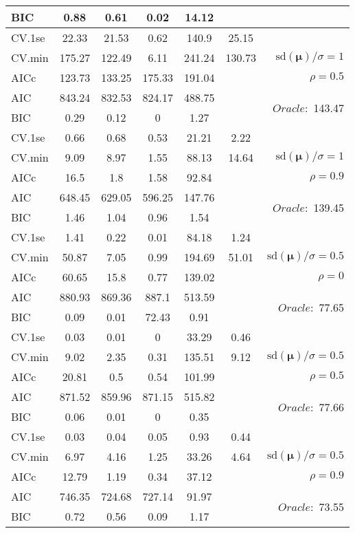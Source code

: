 \begin{table}
\begin{center}
\begin{tabular}{l*{5}{c}|r}
BIC & 0.88 & 0.61 & 0.02 & 14.12 & &  \\
 \hline 
CV.1se & 22.33 & 21.53 & 0.62 & 140.9 & 25.15 & \\
CV.min & 175.27 & 122.49 & 6.11 & 241.24 & 130.73 &  $\mathrm{sd}(\mathbf{\mu})/\sigma=1$ \\
AICc & 123.73 & 133.25 & 175.33 & 191.04 & & $\rho=0.5$ \\
AIC & 843.24 & 832.53 & 824.17 & 488.75 & &  \multirow{2}{*}{$Oracle: $ 143.47} \\
BIC & 0.29 & 0.12 & 0 & 1.27 & &  \\
 \hline 
CV.1se & 0.66 & 0.68 & 0.53 & 21.21 & 2.22 & \\
CV.min & 9.09 & 8.97 & 1.55 & 88.13 & 14.64 &  $\mathrm{sd}(\mathbf{\mu})/\sigma=1$ \\
AICc & 16.5 & 1.8 & 1.58 & 92.84 & & $\rho=0.9$ \\
AIC & 648.45 & 629.05 & 596.25 & 147.76 & &  \multirow{2}{*}{$Oracle: $ 139.45} \\
BIC & 1.46 & 1.04 & 0.96 & 1.54 & &  \\
 \hline 
CV.1se & 1.41 & 0.22 & 0.01 & 84.18 & 1.24 & \\
CV.min & 50.87 & 7.05 & 0.99 & 194.69 & 51.01 &  $\mathrm{sd}(\mathbf{\mu})/\sigma=0.5$ \\
AICc & 60.65 & 15.8 & 0.77 & 139.02 & & $\rho=0$ \\
AIC & 880.93 & 869.36 & 887.1 & 513.59 & &  \multirow{2}{*}{$Oracle: $ 77.65} \\
BIC & 0.09 & 0.01 & 72.43 & 0.91 & &  \\
 \hline 
CV.1se & 0.03 & 0.01 & 0 & 33.29 & 0.46 & \\
CV.min & 9.02 & 2.35 & 0.31 & 135.51 & 9.12 &  $\mathrm{sd}(\mathbf{\mu})/\sigma=0.5$ \\
AICc & 20.81 & 0.5 & 0.54 & 101.99 & & $\rho=0.5$ \\
AIC & 871.52 & 859.96 & 871.15 & 515.82 & &  \multirow{2}{*}{$Oracle: $ 77.66} \\
BIC & 0.06 & 0.01 & 0 & 0.35 & &  \\
 \hline 
CV.1se & 0.03 & 0.04 & 0.05 & 0.93 & 0.44 & \\
CV.min & 6.97 & 4.16 & 1.25 & 33.26 & 4.64 &  $\mathrm{sd}(\mathbf{\mu})/\sigma=0.5$ \\
AICc & 12.79 & 1.19 & 0.34 & 37.12 & & $\rho=0.9$ \\
AIC & 746.35 & 724.68 & 727.14 & 91.97 & &  \multirow{2}{*}{$Oracle: $ 73.55} \\
BIC & 0.72 & 0.56 & 0.09 & 1.17 & &  \\
 \hline 
\end{tabular}
\end{center}
\vspace{-1cm}
\end{table}




